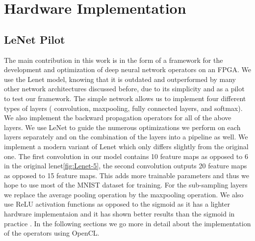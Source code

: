 
\chapter{Hardware Implementation} %

\label{Chapter3} %


\section{LeNet Pilot} \label{lenetpilot}

The main contribution in this work is in the form of a framework for the development and optimization of deep neural network operators on an FPGA. We use the Lenet \cite{lenet} model, knowing that it is outdated and outperformed by many other network architectures discussed before, due to its simplicity and as a pilot to test our framework. The simple network allows us to implement four different types of layers ( convolution, maxpooling, fully connected layers, and softmax). We also implement the backward propagation operators for all of the above layers.  We use LeNet to guide the numerous optimizations we perform on each layers separately and on the combination of the layers into a pipeline as well. We implement a modern variant of Lenet which only differs slightly from the original one. The first convolution in our model contains 10 feature maps as opposed to 6 in the original lenet\ref{fig:Lenet-5}, the second convolution outputs 20 feature maps as opposed to 15 feature maps. This adds more trainable parameters and thus we hope to use most of the MNIST dataset for training. For the sub-sampling layers we replace the average pooling operation by the maxpooling operation. We also use ReLU activation functions as opposed to the sigmoid as it has a lighter hardware implementaion and it has shown better results than the sigmoid in practice \cite{alexnet}. In the following sections we go more in detail about the implementation of the operators using OpenCL. 

